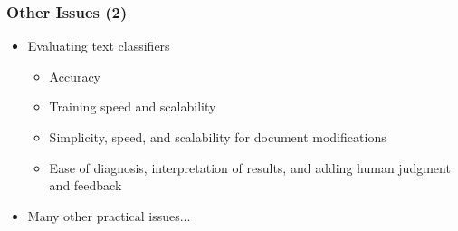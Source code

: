 \documentclass{beamer}
\begin{document}
\begin{frame}
  \frametitle{Other Issues (2)}
  
  \begin{itemize}
  \item Evaluating text classifiers
    \begin{itemize}
    \item Accuracy
    \item Training speed and scalability
    \item Simplicity, speed, and scalability for document modifications
    \item Ease of diagnosis, interpretation of results, and adding human
      judgment and feedback
    \end{itemize}
  \end{itemize}
  \begin{itemize}
  \item Many other practical issues...
  \end{itemize}
\end{frame}


\end{document}
